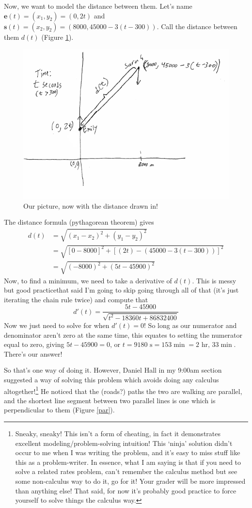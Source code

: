 \documentclass[english]{article}
\renewcommand\vec{\mathbf}
\newcommand{\st}{\text{ s}}
\theoremstyle{remark}
\theoremstyle{definition}
\begin{document}
 Now, we want to model the distance between them. Let's name $\vec{e}(t)=(x_1,y_2)=(0,2t)$ and $\vec{s}(t)=(x_2,y_2)=(8000,45000-3(t-300))$. Call the distance between them $d(t)$ (Figure \ref{dist}).
 \begin{figure}[h!]\begin{centering}
 	\includegraphics[scale=.7]{fig3}\caption{Our picture, now with the distance drawn in!}\label{dist}
 \end{centering}\end{figure}
 
  The distance formula (pythagorean theorem) gives \begin{align*}d(t)&=\sqrt{(x_1-x_2)^2+(y_1-y_2)^2}\\
 &=\sqrt{[0-8000]^2+[(2t)-(45000-3(t-300))]^2}\\
 &=\sqrt{(-8000)^2+(5 t-45900)^2}
 \end{align*}
Now, to find a minimum, we need to take a derivative of $d(t)$. This is messy but good practice\textemdash that said I'm going to skip going through all of that (it's just iterating the chain rule twice) and compute that $$d'(t)=\frac{5 t-45900}{\sqrt{t^2-18360 t+86832400}}$$
Now we just need to solve for when $d'(t)=0$! So long as our numerator and denominator aren't zero at the same time, this equates to setting the numerator equal to zero, giving $5t-45900=0$, or $t=9180\st=153\min=2\text{ hr, }33\min$. There's our answer!

So that's one way of doing it. However, Daniel Hall in my 9:00am section suggested a way of solving this problem which avoids doing any calculus altogether!\footnote{Sneaky, sneaky! This isn't a form of cheating, in fact it demonstrates excellent modeling/problem-solving intuition! This `ninja' solution didn't occur to me when I was writing the problem, and it's easy to miss stuff like this as a problem-writer. In essence, what I am saying is that if you need to solve a related rates problem, can't remember the calculus method but see some non-calculus way to do it, go for it! Your grader will be more impressed than anything else! That said, for now it's probably good practice to force yourself to solve things the calculus way. } He noticed that the (roads?) paths the two are walking are parallel, and the shortest line segment between two parallel lines is one which is perpendicular to them (Figure \ref{par}).
\end{document}
